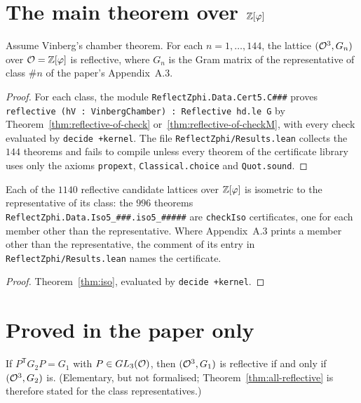 \chapter{The main theorem over \texorpdfstring{$\mathbb{Z}[\varphi]$}{Z[phi]}}\label{chap:main}

\begin{theorem}\label{thm:all-reflective}
\leanok
{}
Assume Vinberg's chamber theorem. For each $n=1,\dots,144$, the lattice $(\mathcal{O}^3,G_n)$ over
$\mathcal{O}=\mathbb{Z}[\varphi]$ is reflective, where $G_n$ is the Gram matrix of the representative of
class $\#n$ of the paper's Appendix~A.3.
\end{theorem}
\begin{proof}\leanok
For each class, the module \texttt{ReflectZphi.Data.Cert5.C\#\#\#} proves
\texttt{reflective (hV : VinbergChamber) : Reflective hd.le G} by
Theorem~\ref{thm:reflective-of-check} or~\ref{thm:reflective-of-checkM}, with every check
evaluated by \texttt{decide +kernel}. The file \texttt{ReflectZphi/Results.lean} collects
the $144$ theorems and fails to compile unless every theorem of the certificate library uses
only the axioms \texttt{propext}, \texttt{Classical.choice} and \texttt{Quot.sound}.
\end{proof}

\begin{theorem}\label{thm:iso-classes}
\leanok
Each of the $1140$ reflective candidate lattices over $\mathbb{Z}[\varphi]$ is isometric to the
representative of its class: the $996$ theorems \texttt{ReflectZphi.Data.Iso5\_\#\#\#.iso5\_\#\#\#\#\#}
are \texttt{checkIso} certificates, one for each member other than the representative.
Where Appendix~A.3 prints a member other than the representative, the comment of its entry
in \texttt{ReflectZphi/Results.lean} names the certificate.
\end{theorem}
\begin{proof}\leanok
Theorem~\ref{thm:iso}, evaluated by \texttt{decide +kernel}.
\end{proof}

\chapter{Proved in the paper only}\label{chap:not-formalised}

\begin{theorem}\label{thm:transfer}
\notready
{}
If $P^{\mathsf T}G_2P=G_1$ with $P\in GL_3(\mathcal{O})$, then $(\mathcal{O}^3,G_1)$ is reflective if and only
if $(\mathcal{O}^3,G_2)$ is. (Elementary, but not formalised; Theorem~\ref{thm:all-reflective} is
therefore stated for the class representatives.)
\end{theorem}

